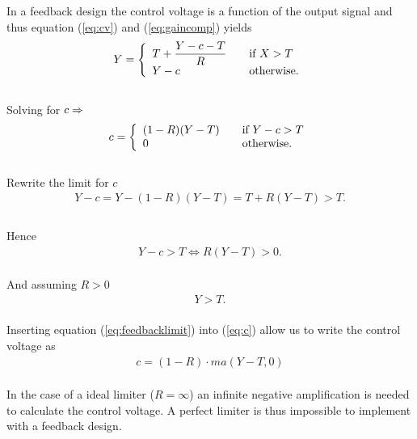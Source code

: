 \documentclass[]{article}
\begin{document}
In a feedback design the control voltage is a function of the output signal and thus equation (\ref{eq:cv}) and (\ref{eq:gaincomp}) yields
\begin{equation}
Y = \left\{ 
  \begin{array}{l l}
    T+ \dfrac{Y-c-T}{R} & \quad \text{if $X > T$}\\
    Y-c & \quad \text{otherwise.}
  \end{array} \right.
\end{equation}
\\Solving for $c \rm \Rightarrow$
\begin{equation} \label{eq:c}
c = \left\{ 
  \begin{array}{l l}
    (1-R)(Y-T)& \quad \text{if $Y-c > T$}\\
    0 & \quad \text{otherwise.}
  \end{array} \right.
\end{equation}
\\Rewrite the limit for $c$
\begin{align*}
Y - c  = Y-(1-R)(Y-T) = T + R(Y-T) > T.   \\
\end{align*}
\\Hence 
\begin{align*}
Y-c > T \Longleftrightarrow R(Y-T)  > 0.
\end{align*}
\\And assuming $R > 0$
\begin{align} \label{eq:feedbacklimit}
Y > T.
\end{align}
\\Inserting equation (\ref{eq:feedbacklimit}) into (\ref{eq:c}) allow us to write the control voltage as
\begin{align}
c = (1-R)\cdot ma\left(Y-T,0\right)
\end{align}
\\In the case of a ideal limiter ($R = \infty$) an infinite negative amplification is needed to calculate the control voltage. A perfect limiter is thus impossible to implement with a feedback design.


\end{document}
